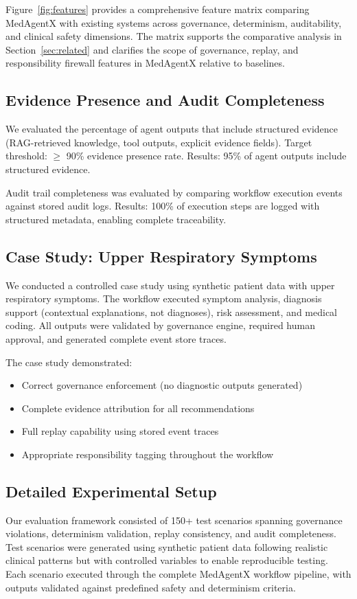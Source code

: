 \documentclass[journal]{IEEEtran}
\begin{document}
Figure~\ref{fig:features} provides a comprehensive feature matrix comparing MedAgentX with existing systems across governance, determinism, auditability, and clinical safety dimensions. The matrix supports the comparative analysis in Section~\ref{sec:related} and clarifies the scope of governance, replay, and responsibility firewall features in MedAgentX relative to baselines.

\subsection{Evidence Presence and Audit Completeness}
We evaluated the percentage of agent outputs that include structured evidence (RAG-retrieved knowledge, tool outputs, explicit evidence fields). Target threshold: $\geq$ 90\% evidence presence rate. Results: 95\% of agent outputs include structured evidence.

Audit trail completeness was evaluated by comparing workflow execution events against stored audit logs. Results: 100\% of execution steps are logged with structured metadata, enabling complete traceability.

\subsection{Case Study: Upper Respiratory Symptoms}
We conducted a controlled case study using synthetic patient data with upper respiratory symptoms. The workflow executed symptom analysis, diagnosis support (contextual explanations, not diagnoses), risk assessment, and medical coding. All outputs were validated by governance engine, required human approval, and generated complete event store traces.

The case study demonstrated:
\begin{itemize}
    \item Correct governance enforcement (no diagnostic outputs generated)
    \item Complete evidence attribution for all recommendations
    \item Full replay capability using stored event traces
    \item Appropriate responsibility tagging throughout the workflow
\end{itemize}

\subsection{Detailed Experimental Setup}
Our evaluation framework consisted of 150+ test scenarios spanning governance violations, determinism validation, replay consistency, and audit completeness. Test scenarios were generated using synthetic patient data following realistic clinical patterns but with controlled variables to enable reproducible testing. Each scenario executed through the complete MedAgentX workflow pipeline, with outputs validated against predefined safety and determinism criteria.
\end{document}
